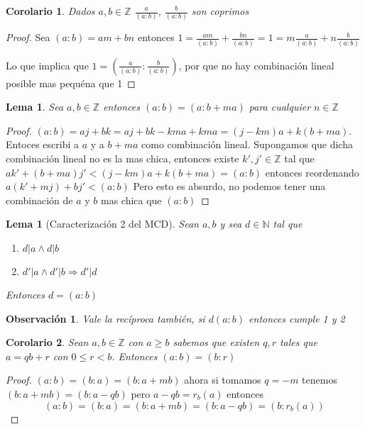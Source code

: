\documentclass{article}
\theoremstyle{break}
\newtheorem{corollary}{Corolario}[theorem]
\newtheorem{lemma}[theorem]{Lema}
\newtheorem*{remark}{Observación}
\def \N{\mathbb{N}}
\def \Z{\mathbb{Z}}
\begin{document}
    \begin{corollary}
        Dados $a,b\in\Z$ $\frac{a}{(a:b)}$, $\frac{b}{(a:b)}$ son coprimos
    \end{corollary}
    \begin{proof}
        Sea $(a:b) = am + bn$ entonces $1 = \frac{am}{(a:b)} + \frac{bn}{(a:b)} = 1 = m\frac{a}{(a:b)} + n\frac{b}{(a:b)}$
        
        Lo que implica que $1=(\frac{a}{(a:b)}:\frac{b}{(a:b)})$, por que no hay combinación lineal posible
        mas pequéna que 1
    \end{proof}

    \begin{lemma}
        Sea $a,b \in \Z$ entonces $(a:b) = (a:b+ma)$ para cualquier $n\in\Z$
    \end{lemma}
    \begin{proof}
        $(a:b) = aj +bk = aj +bk -kma + kma = (j-km)a + k(b +ma)$. Entoces escribi a $a$ y a $b+ma$ como
        combinación lineal.
        Supongamos que dicha combinación lineal no es la mas chica, entonces existe $k',j'\in \Z$ 
        tal que $ak' + (b+ma)j' < (j-km)a + k(b +ma) = (a:b)$ entonces reordenando $a(k' +mj) + bj' < (a:b)$
        Pero esto es absurdo, no podemos tener una combinación de $a$ y $b$ mas chica que $(a:b)$
    \end{proof}

    \begin{lemma}[Caracterización 2 del MCD]
        Sean $a,b$ y sea $d\in \N$ tal que 
        \begin{enumerate}
            \item $d|a \land d|b$
            \item $d'|a \land d'|b \Rightarrow d'|d$
        \end{enumerate}

        Entonces $d = (a:b)$
        
    \end{lemma}

    \begin{remark}
        Vale la recíproca también, si $d(a:b)$ entonces cumple 1 y 2
    \end{remark}

    \begin{corollary}
        Sean $a,b\in\Z$ con $a\geq b$ sabemos que existen $q,r$ tales que $a = qb + r$ con $0 \leq r < b$.
        Entonces $(a:b) = (b:r)$
    \end{corollary}
    \begin{proof}
        $(a:b) = (b:a) = (b: a + mb)$ ahora si tomamos $q= -m$ tenemos $(b:a+mb) = (b:a -qb)$ pero 
        $a-qb = r_b(a)$ entonces $$ (a:b) = (b:a) = (b: a + mb) = (b:a -qb) = (b:r_b(a)) $$    
    \end{proof}
\end{document}
